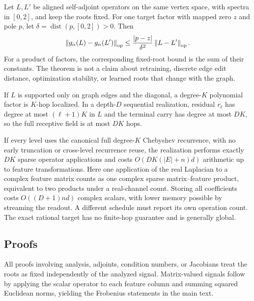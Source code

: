 \begin{theorem}
\label{thm:graph-perturbation}
Let $L,L'$ be aligned self-adjoint operators on the same vertex space, with
spectra in $[0,2]$, and keep the roots fixed.  For one target factor with
mapped zero $z$ and pole $p$, let
$\delta=\operatorname{dist}(p,[0,2])>0$.  Then
\begin{equation}
 \left\lVert g_\alpha(L)-g_\alpha(L')\right\rVert_{\mathrm{op}}
 \leq\frac{|p-z|}{\delta^2}\left\lVert L-L'\right\rVert_{\mathrm{op}}.
 \label{eq:graph-perturbation}
\end{equation}
For a product of factors, the corresponding fixed-root bound is the sum of
their constants.  The theorem is not a claim about retraining, discrete edge
edit distance, optimization stability, or learned roots that change with the
graph.
\end{theorem}

\begin{proposition}
\label{prop:locality-cost}
If $L$ is supported only on graph edges and the diagonal, a degree-$K$
polynomial factor is $K$-hop localized.  In a depth-$D$ sequential
realization, residual $r_\ell$ has degree at most $(\ell+1)K$ in $L$ and the
terminal carry has degree at most $DK$, so the full receptive field is at most
$DK$ hops.

If every level uses the canonical full degree-$K$ Chebyshev recurrence, with
no early truncation or cross-level recurrence reuse, the realization performs
exactly $DK$ sparse operator applications and costs
$O(DK(|E|+n)d)$ arithmetic up to feature transformations.  Here one
application of the real Laplacian to a complex feature matrix counts as one
complex sparse matrix--feature product, equivalent to two products under a
real-channel count.  Storing all coefficients costs $O((D+1)nd)$ complex
scalars, with lower memory possible by streaming the readout.  A different
schedule must report its own operation count.  The exact rational target has
no finite-hop guarantee and is generally global.
\end{proposition}

\subsection{Proofs}

All proofs involving analysis, adjoints, condition numbers, or Jacobians treat
the roots as fixed independently of the analyzed signal.  Matrix-valued
signals follow by applying the scalar operator to each feature column and
summing squared Euclidean norms, yielding the Frobenius statements in the
main text.

